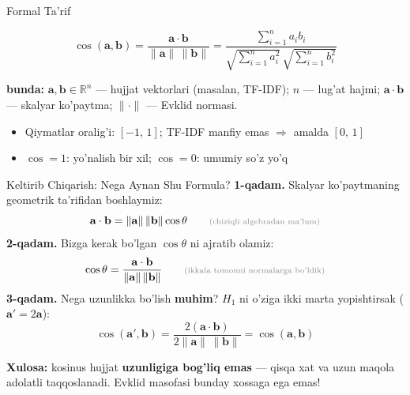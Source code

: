 \documentclass[aspectratio=169,11pt]{beamer}
\newcommand{\bunda}[1]{{\small\textbf{bunda:}\; #1}}
\begin{document}
\begin{frame}{Formal Ta'rif}
  \begin{tcolorbox}[defbox,title=Ta'rif: kosinus o'xshashligi]
    \vspace{-0.6em}
    $$\cos(\mathbf{a},\mathbf{b})
      = \frac{\mathbf{a}\cdot\mathbf{b}}
             {\lVert\mathbf{a}\rVert\,\lVert\mathbf{b}\rVert}
      = \frac{\sum_{i=1}^{n} a_i b_i}
             {\sqrt{\sum_{i=1}^{n} a_i^2}\,\sqrt{\sum_{i=1}^{n} b_i^2}}$$
  \end{tcolorbox}
  \vspace{0.2em}
  \bunda{$\mathbf{a},\mathbf{b}\in\mathbb{R}^n$ --- hujjat vektorlari
  (masalan, TF-IDF); $n$ --- lug'at hajmi; $\mathbf{a}\cdot\mathbf{b}$
  --- skalyar ko'paytma; $\lVert\cdot\rVert$ --- Evklid normasi.}
  \vspace{0.5em}
  \begin{itemize}\setlength\itemsep{3pt}
    \item Qiymatlar oralig'i: $[-1,\,1]$; TF-IDF manfiy emas
          $\Rightarrow$ amalda $[0,\,1]$
    \item $\cos = 1$: yo'nalish bir xil; $\cos = 0$: umumiy so'z yo'q
  \end{itemize}
\end{frame}

\begin{frame}{Keltirib Chiqarish: Nega Aynan Shu Formula?}
  \textbf{1-qadam.} Skalyar ko'paytmaning geometrik ta'rifidan boshlaymiz:
  $$\mathbf{a}\cdot\mathbf{b}
    = \lVert\mathbf{a}\rVert\,\lVert\mathbf{b}\rVert\cos\theta
    \qquad\text{\scriptsize\color{halfgray}(chiziqli algebradan ma'lum)}$$
  \pause
  \textbf{2-qadam.} Bizga kerak bo'lgan $\cos\theta$ ni ajratib olamiz:
  $$\cos\theta
    = \frac{\mathbf{a}\cdot\mathbf{b}}
           {\lVert\mathbf{a}\rVert\,\lVert\mathbf{b}\rVert}
    \qquad\text{\scriptsize\color{halfgray}(ikkala tomonni normalarga bo'ldik)}$$
  \pause
  \textbf{3-qadam.} Nega uzunlikka bo'lish \textbf{muhim}?
  $H_1$ ni o'ziga ikki marta yopishtirsak ($\mathbf{a}' = 2\mathbf{a}$):
  $$\cos(\mathbf{a}',\mathbf{b})
    = \frac{2(\mathbf{a}\cdot\mathbf{b})}
           {2\lVert\mathbf{a}\rVert\,\lVert\mathbf{b}\rVert}
    = \cos(\mathbf{a},\mathbf{b})$$
  \begin{tcolorbox}[okbox]
    \small \textbf{Xulosa:} kosinus hujjat \textbf{uzunligiga bog'liq emas}
    --- qisqa xat va uzun maqola adolatli taqqoslanadi. Evklid
    masofasi bunday xossaga ega emas!
  \end{tcolorbox}
\end{frame}
\end{document}
